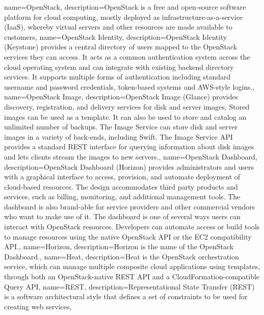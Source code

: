 {
  name={OpenStack},
  description={OpenStack is a free and open-source software platform for
  cloud computing, mostly deployed as infrastructure-as-a-service
  (IaaS), whereby virtual servers and other resources are made available
  to customers},
}
{
  name={OpenStack Identity},
  description={OpenStack Identity (Keystone) provides a central
  directory of users mapped to the OpenStack services they can
  access. It acts as a common authentication system across the cloud
  operating system and can integrate with existing backend directory
  services. It supports multiple forms of authentication including
  standard username and password credentials, token-based systems and
  AWS-style logins.},
}
{
  name={OpenStack Image},
  description={OpenStack Image (Glance) provides discovery,
  registration, and delivery services for disk and server images. Stored
  images can be used as a template. It can also be used to store and
  catalog an unlimited number of backups. The Image Service can store
  disk and server images in a variety of back-ends, including Swift. The
  Image Service API provides a standard \gls{REST} interface for
  querying information about disk images and lets clients stream the
  images to new servers.},
}
{
  name={OpenStack Dashboard},
  description={OpenStack Dashboard (Horizon) provides administrators and
  users with a graphical interface to access, provision, and automate
  deployment of cloud-based resources. The design accommodates third
  party products and services, such as billing, monitoring, and
  additional management tools. The dashboard is also brand-able for
  service providers and other commercial vendors who want to make use of
  it. The dashboard is one of several ways users can interact with
  OpenStack resources. Developers can automate access or build tools to
  manage resources using the native OpenStack API or the EC2
  compatibility API.},
}
{
  name={Horizon},
  description={Horizon is the name of the \gls{OpenStack Dashboard}.},
}
{
  name={Heat},
  description={Heat is the OpenStack orchestration service, which can
  manage multiple composite cloud applications using templates,
  through both an OpenStack-native \gls{REST} API and a
  CloudFormation-compatible Query API},
}
{
  name={REST},
  description={Representational State Transfer (REST) is a software
  architectural style that defines a set of constraints to be used for
  creating web services},
}
